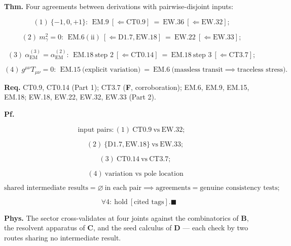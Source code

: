 \begin{theorem}\label{tag:EM-26}
\textbf{Thm.} Four agreements between derivations with pairwise-disjoint inputs:

\[
(1)\ \{-1,0,+1\}:\ \ \mathrm{EM.9}\ [\Leftarrow\mathrm{CT0.9}]\ =\ \mathrm{EW.36}\ [\Leftarrow\mathrm{EW.32}];
\]

\[
(2)\ m_\gamma^2=0:\ \ \mathrm{EM.6(ii)}\ [\Leftarrow\mathrm{D1.7},\mathrm{EW.18}]\ =\ \mathrm{EW.22}\ [\Leftarrow\mathrm{EW.33}];
\]

\[
(3)\ \alpha_{\mathrm{EM}}^{(3)}=\alpha_{\mathrm{EM}}^{(2)}:\ \ \mathrm{EM.18}\ \text{step 2}\ [\Leftarrow\mathrm{CT0.14}]\ =\ \mathrm{EM.18}\ \text{step 3}\ [\Leftarrow\mathrm{CT3.7}];
\]

\[
(4)\ g^{\mu\nu}T_{\mu\nu}=0:\ \ \mathrm{EM.15}\ \text{(explicit variation)}\ =\ \mathrm{EM.6}\ \text{(massless transit}\implies\text{traceless stress)}.
\]

\textbf{Req.} CT0.9, CT0.14 (Part 1); CT3.7 (\textbf{F}, corroboration); EM.6, EM.9, EM.15, EM.18; EW.18, EW.22, EW.32, EW.33 (Part 2).

\textbf{Pf.}

\[
\text{input pairs}: (1)\ \mathrm{CT0.9}\ \text{vs}\ \mathrm{EW.32};
\]

\[
\quad (2)\ \{\mathrm{D1.7},\mathrm{EW.18}\}\ \text{vs}\ \mathrm{EW.33};
\]

\[
\quad (3)\ \mathrm{CT0.14}\ \text{vs}\ \mathrm{CT3.7};
\]

\[
\quad (4)\ \text{variation vs pole location}
\]

\[
\text{shared intermediate results}=\varnothing\ \text{in each pair}\implies\text{agreements}=\text{genuine consistency tests};
\]

\[
\qquad \forall4:\ \text{hold}\ [\text{cited tags}]. \blacksquare
\]

\textbf{Phys.} The sector cross-validates at four joints against the combinatorics of \textbf{B}, the resolvent apparatus of \textbf{C}, and the seed calculus of \textbf{D} — each check by two routes sharing no intermediate result.

\end{theorem}

